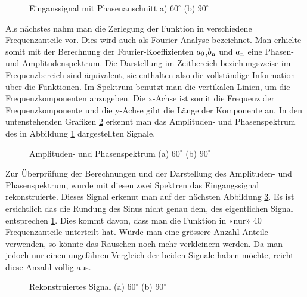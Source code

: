 \begin{figure}[h]
	\centering
	\qquad
	\caption{Einganssignal mit Phasenanschnitt a) $60^\circ$ (b) $90^\circ$}
	\label{fig:eingangssignal}
\end{figure} 


Als nächstes nahm man die Zerlegung der Funktion in verschiedene Frequenzanteile vor. Dies wird auch als Fourier-Analyse bezeichnet. Man erhielte somit mit der Berechnung der Fourier-Koeffizienten $a\textsubscript{0}$,$b\textsubscript{n}$ und $a\textsubscript{n}$ eine Phasen- und Amplitudenspektrum. Die Darstellung im Zeitbereich beziehungsweise im Frequenzbereich sind äquivalent, sie enthalten also die vollständige Information über die Funktionen. Im Spektrum benutzt man die vertikalen Linien, um die Frequenzkomponenten anzugeben. Die x-Achse ist somit die Frequenz der Frequenzkomponente und die y-Achse gibt die Länge der Komponente an. In den untenstehenden Grafiken \ref{fig:Amplituden- und Phasenspektrum} erkennt man das Amplituden- und Phasenspektrum des in Abbildung \ref{fig:eingangssignal} dargestellten Signale.

\begin{figure}[h]
	\centering
	\qquad
	\caption{Amplituden- und Phasenspektrum (a) $60^\circ$ (b) $90^\circ$}
	\label{fig:Amplituden- und Phasenspektrum}
\end{figure} 

Zur Überprüfung der Berechnungen und der Darstellung des Amplituden- und Phasenspektrum, wurde mit diesen zwei Spektren das Eingangssignal rekonstruierte. Dieses Signal erkennt man auf der nächsten Abbildung \ref{fig:Rekonstruiertes Signal}. Es ist ersichtlich das die Rundung des Sinus nicht genau dem, des eigentlichen Signal entsprechen \ref{fig:eingangssignal}. Dies kommt davon, dass man die Funktion in «nur» 40 Frequenzanteile unterteilt hat. Würde man eine grössere Anzahl Anteile verwenden, so könnte das Rauschen noch mehr verkleinern werden. Da man jedoch nur einen ungefähren Vergleich der beiden Signale haben möchte, reicht diese Anzahl völlig aus. 

\begin{figure}[h]
	\centering
	\qquad
	\caption{Rekonstruiertes Signal (a) $60^\circ$ (b) $90^\circ$}
	\label{fig:Rekonstruiertes Signal}
\end{figure} 


